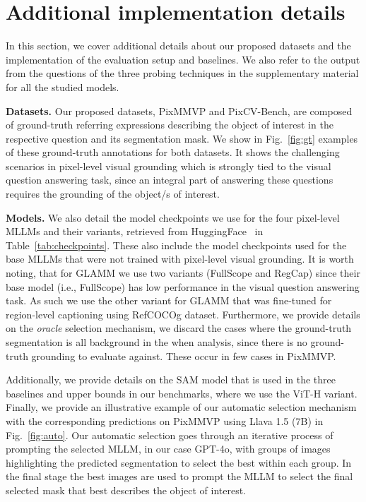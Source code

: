 \section{Additional implementation details}
\label{app:impdetails}
In this section, we cover additional details about our proposed datasets and the implementation of the evaluation setup and baselines. We also refer to the output from the questions of the three probing techniques in the supplementary material for all the studied models. 

\textbf{Datasets.} Our proposed datasets, PixMMVP and PixCV-Bench, are composed of ground-truth referring expressions describing the object of interest in the respective question and its segmentation mask. We show in Fig.~\ref{fig:gt} examples of these ground-truth annotations for both datasets. It shows the challenging scenarios in pixel-level visual grounding which is strongly tied to the visual question answering task, since an integral part of answering these questions requires the grounding of the object/s of interest.

\textbf{Models.} We also detail the model checkpoints we use for the four pixel-level MLLMs and their variants, retrieved from HuggingFace~\cite{wolf2019huggingface} in Table~\ref{tab:checkpoints}. These also include the model checkpoints used for the base MLLMs that were not trained with pixel-level visual grounding. It is worth noting, that for GLAMM we use two variants (FullScope and RegCap) since their base model (i.e., FullScope) has low performance in the visual question answering task. As such we use the other variant for GLAMM that was fine-tuned for region-level captioning using RefCOCOg dataset. Furthermore, we provide details on the \textit{oracle} selection mechanism, we discard the cases where the ground-truth segmentation is all background in the when analysis, since there is no ground-truth grounding to evaluate against. These occur in few cases in PixMMVP.

Additionally, we provide details on the SAM model that is used in the three baselines and upper bounds in our benchmarks, where we use the ViT-H variant. Finally, we provide an illustrative example of our automatic selection mechanism with the corresponding predictions on PixMMVP using Llava 1.5 (7B) in Fig.~\ref{fig:auto}. Our automatic selection goes through an iterative process of prompting the selected MLLM, in our case GPT-4o, with groups of images highlighting the predicted segmentation to select the best within each group. In the final stage the best images are used to prompt the MLLM to select the final selected mask that best describes the object of interest.

